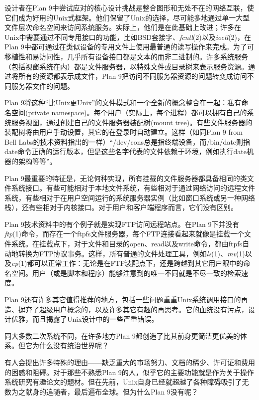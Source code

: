 \documentclass[12pt,oneside]{book}
\begin{document}
设计者在Plan 9中尝试应对的核心设计挑战是整合图形和无处不在的网络互联，使它们成为好用的Unix式框架。他们保留了Unix的选择，尽可能多地通过单一大型文件层次命名空间来访问系统服务。实际上，他们是在此基础上改进；许多在Unix中需要通过不同专用接口的功能，比如BSD套接字、\textit{fcntl}(2)以及\textit{ioctl}(2)，在Plan 9中都可通过在类似设备的专用文件上使用最普通的读写操作来完成。为了可移植性和易访问性，几乎所有设备接口都是文本的而非二进制的。许多系统服务（包括视窗系统在内）都是文件服务器，以特殊文件或目录树来表示服务资源。通过将所有的资源都表示成文件，Plan 9把访问不同服务器资源的问题转变成访问不同服务器文件的问题。

Plan 9将这种“比Unix更Unix”的文件模式和一个全新的概念整合在一起：私有命名空间(private namespace)。每个用户（实际上，每个进程）都可以拥有自己的系统服务视图，通过创建自己的文件服务器装配树(mount tree)。有些文件服务器的装配树将由用户手动设置，其它的在登录时自动建立。这样（如同Plan 9 from Bell Labs的技术资料指出的一样）“/dev/cons总是指终端设备，而/bin/date则指date命令正确的运行版本，但是这些名字代表的文件依赖于环境，例如执行date机器的架构等等”。

Plan 9最重要的特征是，无论何种实现，所有挂载的文件服务器都具备相同的类文件系统接口。有些可能相对于本地文件系统，有些相对于通过网络访问的远程文件系统，有些相对于在用户空间运行的系统服务器实例（比如窗口系统或另一种网络栈），还有些相对于内核接口。对于用户和客户端程序而言，它们没有区别。

Plan 9技术资料中的有个例子就是实现FTP访问远程站点。在Plan 9下并没有\textit{ftp}(1)命令，而存在一个ftpfs文件服务器，每个FTP连接看起来就像是挂载一个文件系统。在挂载点下，对于文件和目录的open、read以及write命令，都由ftpfs自动地转换为FTP协议事务。这样，所有普通的文件处理工具，例如\textit{ls}(1)、\textit{mv}(1)以及\textit{cp}(1)都可以正常工作：无论是在FTP装配点下，还是跨越到其它用户眼中的命名空间。用户（或是脚本和程序）能够注意到的唯一不同就是不尽一致的检索速度。

Plan 9还有许多其它值得推荐的地方，包括一些问题重重Unix系统调用接口的再造、摒弃了超级用户概念的，以及许多其它有趣的再思考。它的血统没有污点，设计优雅，而且揭露了Unix设计中的一些严重错误。

同大多数二次系统不同，在许多地方Plan 9都创造了比其前身更简洁更优美的体系。但它为什么没有统治世界呢？

有人会提出许多特殊的理由——缺乏重大的市场努力、文档的稀少、许可证和费用的困惑和阻碍。对于那些不熟悉Plan 9的人，似乎它的主要功能就是作为关于操作系统研究有趣论文的题材。但在先前，Unix自身已经就超越了各种障碍吸引了无数为之献身的追随者，最后遍布全球。但为什么Plan 9没有呢？
\end{document}
